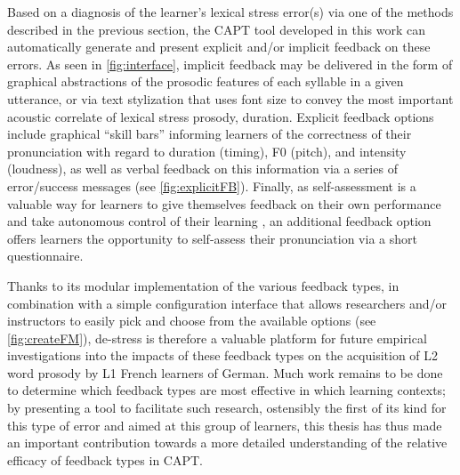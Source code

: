 \documentclass[11pt,a4paper,onecolumn]{article}
\newcommand{\TODO}[1]{{\color{red}\textbf{[TODO #1]}}}
\begin{document}
Based on a diagnosis of the learner's lexical stress error(s) via one of the methods described in the previous section, the CAPT tool developed in this work can automatically generate and present explicit %
and/or implicit %
feedback on these errors. 
%
As seen in \cref{fig:interface}, implicit feedback may be delivered in the form of graphical abstractions of the prosodic features of each syllable in a given utterance, or via text stylization that uses font size to convey the most important acoustic correlate of lexical stress prosody, duration.
%
Explicit feedback options include graphical ``skill bars'' %
informing learners of the correctness of their pronunciation with regard to duration (timing), F0 (pitch), and intensity (loudness), as well as verbal feedback on this information via a series of error/success messages (see \cref{fig:explicitFB}). %
Finally, as self-assessment is a valuable way for learners to give themselves feedback on their own performance and take autonomous control of their learning \citep{Neri2002,Mehlhorn2005}, an additional feedback option offers learners the opportunity to self-assess their pronunciation via a short questionnaire. %


Thanks to its modular implementation of the various feedback types, in combination with a simple configuration interface that allows researchers and/or instructors to easily pick and choose from the available options (see \cref{fig:createFM}), %
de-stress is therefore a valuable platform for future empirical investigations into the impacts of these feedback types on the 
acquisition of L2 word prosody 
by L1 French learners of German. 
Much work remains to be done to determine which feedback types are most effective in which learning contexts; by presenting a tool to facilitate such research, ostensibly the first of its kind for this type of error and aimed at this group of learners, this thesis has thus made an important contribution towards a more detailed understanding of the relative efficacy of feedback types in CAPT.
\end{document}
